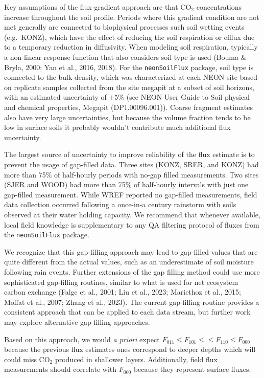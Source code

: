 \documentclass[
  letterpaper,
  DIV=11,
  numbers=noendperiod]{scrartcl}
\begin{document}
Key assumptions of the flux-gradient approach are that CO\(_{2}\)
concentrations increase throughout the soil profile. Periods where this
gradient condition are not met generally are connected to biophysical
processes such soil wetting events (e.g.~KONZ), which have the effect of
reducing the soil respiration or efflux due to a temporary reduction in
diffusivity. When modeling soil respiration, typically a non-linear
response function that also considers soil type is used (Bouma \& Bryla,
2000; Yan et al., 2016, 2018). For the \texttt{neonSoilFlux} package,
soil type is connected to the bulk density, which was characterized at
each NEON site based on replicate samples collected from the site
megapit at a subset of soil horizons, with an estimated uncertainty of
\(\pm5\%\) (see NEON User Guide to Soil physical and chemical
properties, Megapit (DP1.00096.001)). Coarse fragment estimates also
have very large uncertainties, but because the volume fraction tends to
be low in surface soils it probably wouldn't contribute much additional
flux uncertainty.

The largest source of uncertainty to improve reliability of the flux
estimate is to prevent the usage of gap-filled data. Three sites (KONZ,
SRER, and KONZ) had more than 75\% of half-hourly periods with no-gap
filled measurements. Two sites (SJER and WOOD) had more than 75\% of
half-hourly intervals with just one gap-filled measurement. While WREF
reported no gap-filled measurements, field data collection occurred
following a once-in-a century rainstorm with soils observed at their
water holding capacity. We recommend that whenever available, local
field knowledge is supplementary to any QA filtering protocol of fluxes
from the \texttt{neonSoilFlux} package.

We recognize that this gap-filling approach may lead to gap-filled
values that are quite different from the actual values, such as an
underestimate of soil moisture following rain events. Further extensions
of the gap filling method could use more sophisticated gap-filling
routines, similar to what is used for net ecosystem carbon exchange
(Falge et al., 2001; Liu et al., 2023; Mariethoz et al., 2015; Moffat et
al., 2007; Zhang et al., 2023). The current gap-filling routine provides
a consistent approach that can be applied to each data stream, but
further work may explore alternative gap-filling approaches.

Based on this approach, we would \emph{a priori} expect
\(F_{011} \leq F_{101} \leq \leq F_{110} \leq F_{000}\) because the
previous flux estimates ones correspond to deeper depths which will
could miss CO\(_{2}\) produced in shallower layers. Additionally, field
flux measurements should correlate with \(F_{000}\) because they
represent surface fluxes.
\end{document}
